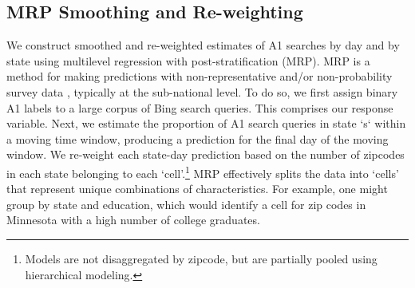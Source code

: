 \documentclass[fleqn,10pt]{wlscirep}
\begin{document}


\subsection*{MRP Smoothing and Re-weighting}

We construct smoothed and re-weighted estimates of A1 searches by day and by state using multilevel regression with post-stratification (MRP). MRP is a method for making predictions with non-representative and/or non-probability survey data \cite{park_gelman_bafumi_2004}, typically at the sub-national level. To do so, we first assign binary A1 labels to a large corpus of Bing search queries. This comprises our response variable. Next, we estimate the proportion of A1 search queries in state `s` within a moving time window, producing a prediction for the final day of the moving window. We re-weight each state-day prediction based on the number of zipcodes in each state belonging to each `cell'.\footnote{Models are not disaggregated by zipcode, but are partially pooled using hierarchical modeling.} MRP effectively splits the data into `cells' that represent unique combinations of characteristics. For example, one might group by state and education, which would identify a cell for zip codes in Minnesota with a high number of college graduates.  
\end{document}
